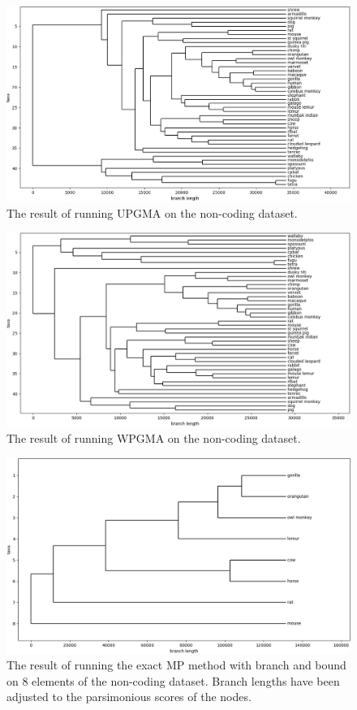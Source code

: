 \documentclass[11pt,twocolumn]{article}
\begin{document}
\begin{figure}
    \centering
    \includegraphics[width=\linewidth]{img/upgma_noncoding.png}
    \caption{The result of running UPGMA on the non-coding dataset.}
    \label{fig:upgma_noncoding}
\end{figure}

\begin{figure}
    \centering
    \includegraphics[width=\linewidth]{img/wpgma_noncoding.png}
    \caption{The result of running WPGMA on the non-coding dataset.}
    \label{fig:wpgma_noncoding}
\end{figure}

\begin{figure}
    \centering
    \includegraphics[width=\linewidth]{img/mp_8_taxa_noncoding_1.png}
    \caption{The result of running the exact MP method with branch and bound on 8 elements of the non-coding dataset. Branch lengths have been adjusted to the parsimonious scores of the nodes.}
    \label{fig:mp_noncoding_1}
\end{figure}
\end{document}
